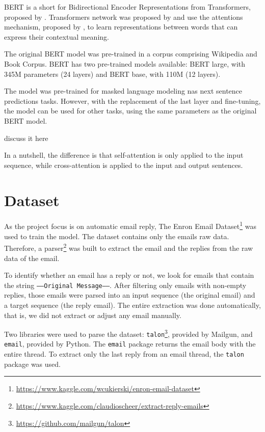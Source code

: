 \documentclass[letterpaper]{article}
\begin{document}
BERT is a short for Bidirectional Encoder Representations from Transformers, proposed by \cite{DBLP:journals/corr/abs-1810-04805}. Transformers network was proposed by \cite{DBLP:journals/corr/VaswaniSPUJGKP17} and use the attentions mechanism, proposed by \cite{DBLP:journals/corr/BahdanauCB14}, to learn representations between words that can express their contextual meaning.

The original BERT model was pre-trained in a corpus comprising Wikipedia and Book Corpus. BERT has two pre-trained models available: BERT large, with \num{345}{M} parameters (24 layers) and BERT base, with \num{110}{M} (12 layers).

The model was pre-trained for masked language modeling nas next sentence predictions tasks. However, with the replacement of the last layer and fine-tuning, the model can be used for other tasks, using the same parameters as the original BERT model.


discuss it here

In a nutshell, the difference is that self-attention is only applied to the input sequence, while cross-attention is applied to the input and output sentences.


\section{Dataset}

As the project focus is on automatic email reply, The Enron Email Dataset\footnote{\href{https://www.kaggle.com/wcukierski/enron-email-dataset}{https://www.kaggle.com/wcukierski/enron-email-dataset}} was used to train the model. The dataset contains only the emails raw data. Therefore, a parser\footnote{\href{https://www.kaggle.com/claudioscheer/extract-reply-emails}{https://www.kaggle.com/claudioscheer/extract-reply-emails}} was built to extract the email and the replies from the raw data of the email.

To identify whether an email has a reply or not, we look for emails that contain the string \texttt{-----Original Message-----}. After filtering only emails with non-empty replies, those emails were parsed into an input sequence (the original email) and a target sequence (the reply email). The entire extraction was done automatically, that is, we did not extract or adjust any email manually.

Two libraries were used to parse the dataset: \texttt{talon}\footnote{\href{https://github.com/mailgun/talon}{https://github.com/mailgun/talon}}, provided by Mailgun, and \texttt{email}, provided by Python. The \texttt{email} package returns the email body with the entire thread. To extract only the last reply from an email thread, the \texttt{talon} package was used.
\end{document}
